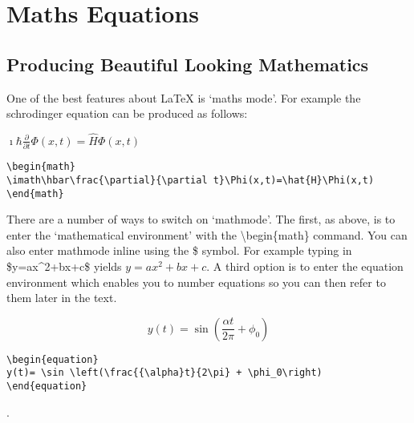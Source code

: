 \chapter{Maths Equations}

\section{Producing Beautiful Looking Mathematics}

One of the best features about LaTeX is `maths mode'.  For example the schrodinger equation can be produced as follows:

\vspace*{2ex}

\begin{center}
\begin{math}
\imath\hbar\frac{\partial}{\partial t}\Phi (x, t) = \hat{H}\Phi (x, t)
\end{math}
\end{center}

\vspace*{2ex}

\begin{verbatim}
\begin{math}
\imath\hbar\frac{\partial}{\partial t}\Phi(x,t)=\hat{H}\Phi(x,t)
\end{math}
\end{verbatim}

There are a number of ways to switch on `mathmode'.  The first, as above, is to enter the `mathematical environment' with the {\textbackslash}begin\{math\} command. You can also enter mathmode inline using the \$ symbol. For example typing in \$y=ax\textasciicircum{}2+bx+c\$ yields $y=ax^2+bx+c$.  A third option is to enter the equation environment which enables you to number equations so you can then refer to them later in the text.

\begin{equation}
y(t)= \sin \left(\frac{{\alpha}t}{2\pi} + \phi_0\right)
\label{eqn:MadeUpNonsense}
\end{equation}

\vspace*{2ex}
\begin{verbatim}
\begin{equation}
y(t)= \sin \left(\frac{{\alpha}t}{2\pi} + \phi_0\right)
\end{equation}
\end{verbatim}.

